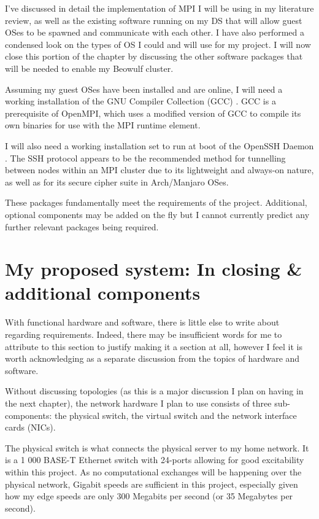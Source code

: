 \textbf{}

I've discussed in detail the implementation of MPI I will be using in my literature review, as well as the existing software running on my DS that will allow guest OSes to be spawned and communicate with each other. I have also performed a condensed look on the types of OS I could and will use for my project. I will now close this portion of the chapter by discussing the other software packages that will be needed to enable my Beowulf cluster.

Assuming my guest OSes have been installed and are online, I will need a working installation of the GNU Compiler Collection (GCC) \cite{gnu_2020}. GCC is a prerequisite of OpenMPI, which uses a modified version of GCC to compile its own binaries for use with the MPI runtime element.

I will also need a working installation set to run at boot of the OpenSSH Daemon \cite{openbsd_2020}. The SSH protocol appears to be the recommended method for tunnelling between nodes within an MPI cluster due to its lightweight and always-on nature, as well as for its secure cipher suite in Arch/Manjaro OSes.

These packages fundamentally meet the requirements of the project. Additional, optional components may be added on the fly but I cannot currently predict any further relevant packages being required.

\section{My proposed system: In closing \& additional components}
With functional hardware and software, there is little else to write about regarding requirements. Indeed, there may be insufficient words for me to attribute to this section to justify making it a section at all, however I feel it is worth acknowledging as a separate discussion from the topics of hardware and software.

\textbf{}

Without discussing topologies (as this is a major discussion I plan on having in the next chapter), the network hardware I plan to use consists of three sub-components: the physical switch, the virtual switch and the network interface cards (NICs).

The physical switch is what connects the physical server to my home network. It is a 1 000 BASE-T Ethernet switch with 24-ports allowing for good excitability within this project. As no computational exchanges will be happening over the physical network, Gigabit speeds are sufficient in this project, especially given how my edge speeds are only 300 Megabits per second (or 35 Megabytes per second).

